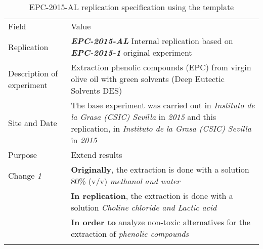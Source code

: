 \begin{table*}[h]
  \caption{EPC-2015-AL replication specification using the template}
\label{tab:edi}
  \centering

\begin{tabularx}{\textwidth}{
  >{\hsize=0.25\hsize}X
  >{\hsize=0.8\hsize}X}
  
    \noalign{\smallskip}\hline\noalign{\smallskip}
  
  Field &  Value  \\ 
  \noalign{\smallskip}\hline\noalign{\smallskip}
 
 Replication &   \textbf{\emph{EPC-2015-AL}}   Internal replication based on \textbf{\emph{EPC-2015-1}}  original experiment   \\

 Description \newline of experiment &  Extraction phenolic compounds (EPC) from virgin olive oil with green solvents (Deep Eutectic Solvents DES) \\  
 
 Site and Date & The base experiment was carried out in  \textit{Instituto de la Grasa (CSIC) Sevilla}  in  \textit{2015} and this replication, in  \textit{Instituto de la Grasa (CSIC) Sevilla} in \textit{2015}    \\
    Purpose  &  Extend results \\  
\hline   
    Change \textit{1}   & \textbf{Originally}, the extraction is done with a solution 80\% (v/v) \emph{methanol and water}  \\& \textbf{In replication}, the extraction is done with a solution \emph{Choline chloride and Lactic acid}  \\& \textbf{In order to} analyze non-toxic alternatives for the extraction of \emph{phenolic compounds}   \\ 
    
  	\noalign{\smallskip\smallskip}\hline
   	
   	
	\end{tabularx}  
\end{table*}
